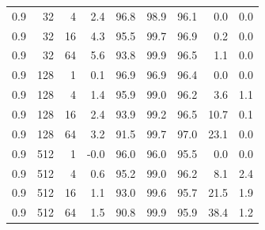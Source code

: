 \begin{tabular}{lrrrrrrrr}
0.9 & 32 & 4 & 2.4 & 96.8 & 98.9 & 96.1 & 0.0 & 0.0 \\
0.9 & 32 & 16 & 4.3 & 95.5 & 99.7 & 96.9 & 0.2 & 0.0 \\
0.9 & 32 & 64 & 5.6 & 93.8 & 99.9 & 96.5 & 1.1 & 0.0 \\
0.9 & 128 & 1 & 0.1 & 96.9 & 96.9 & 96.4 & 0.0 & 0.0 \\
0.9 & 128 & 4 & 1.4 & 95.9 & 99.0 & 96.2 & 3.6 & 1.1 \\
0.9 & 128 & 16 & 2.4 & 93.9 & 99.2 & 96.5 & 10.7 & 0.1 \\
0.9 & 128 & 64 & 3.2 & 91.5 & 99.7 & 97.0 & 23.1 & 0.0 \\
0.9 & 512 & 1 & -0.0 & 96.0 & 96.0 & 95.5 & 0.0 & 0.0 \\
0.9 & 512 & 4 & 0.6 & 95.2 & 99.0 & 96.2 & 8.1 & 2.4 \\
0.9 & 512 & 16 & 1.1 & 93.0 & 99.6 & 95.7 & 21.5 & 1.9 \\
0.9 & 512 & 64 & 1.5 & 90.8 & 99.9 & 95.9 & 38.4 & 1.2 \\
\bottomrule
\end{tabular}
